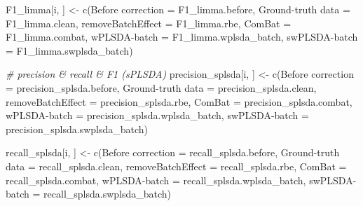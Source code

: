 \documentclass[
]{book}
\newenvironment{Shaded}{\begin{snugshade}}{\end{snugshade}}
\newcommand{\AttributeTok}[1]{\textcolor[rgb]{0.77,0.63,0.00}{#1}}
\newcommand{\CommentTok}[1]{\textcolor[rgb]{0.56,0.35,0.01}{\textit{#1}}}
\newcommand{\FunctionTok}[1]{\textcolor[rgb]{0.00,0.00,0.00}{#1}}
\newcommand{\NormalTok}[1]{#1}
\newcommand{\OtherTok}[1]{\textcolor[rgb]{0.56,0.35,0.01}{#1}}
\newcommand{\StringTok}[1]{\textcolor[rgb]{0.31,0.60,0.02}{#1}}
\begin{document}
\begin{Shaded}
\begin{Highlighting}[]
\NormalTok{  F1\_limma[i, ] }\OtherTok{\textless{}{-}} \FunctionTok{c}\NormalTok{(}\StringTok{\textasciigrave{}}\AttributeTok{Before correction}\StringTok{\textasciigrave{}} \OtherTok{=}\NormalTok{ F1\_limma.before, }
                     \StringTok{\textasciigrave{}}\AttributeTok{Ground{-}truth data}\StringTok{\textasciigrave{}} \OtherTok{=}\NormalTok{ F1\_limma.clean,}
                     \StringTok{\textasciigrave{}}\AttributeTok{removeBatchEffect}\StringTok{\textasciigrave{}} \OtherTok{=}\NormalTok{ F1\_limma.rbe,}
                     \AttributeTok{ComBat =}\NormalTok{ F1\_limma.combat,}
                     \StringTok{\textasciigrave{}}\AttributeTok{wPLSDA{-}batch}\StringTok{\textasciigrave{}} \OtherTok{=}\NormalTok{ F1\_limma.wplsda\_batch,}
                     \StringTok{\textasciigrave{}}\AttributeTok{swPLSDA{-}batch}\StringTok{\textasciigrave{}} \OtherTok{=}\NormalTok{ F1\_limma.swplsda\_batch)}
  
  
  \CommentTok{\# precision \& recall \& F1 (sPLSDA)}
\NormalTok{  precision\_splsda[i, ] }\OtherTok{\textless{}{-}} \FunctionTok{c}\NormalTok{(}\StringTok{\textasciigrave{}}\AttributeTok{Before correction}\StringTok{\textasciigrave{}} \OtherTok{=}\NormalTok{ precision\_splsda.before, }
                             \StringTok{\textasciigrave{}}\AttributeTok{Ground{-}truth data}\StringTok{\textasciigrave{}} \OtherTok{=}\NormalTok{ precision\_splsda.clean,}
                             \StringTok{\textasciigrave{}}\AttributeTok{removeBatchEffect}\StringTok{\textasciigrave{}} \OtherTok{=}\NormalTok{ precision\_splsda.rbe,}
                             \AttributeTok{ComBat =}\NormalTok{ precision\_splsda.combat,}
                             \StringTok{\textasciigrave{}}\AttributeTok{wPLSDA{-}batch}\StringTok{\textasciigrave{}} \OtherTok{=}\NormalTok{ precision\_splsda.wplsda\_batch,}
                             \StringTok{\textasciigrave{}}\AttributeTok{swPLSDA{-}batch}\StringTok{\textasciigrave{}} \OtherTok{=}\NormalTok{ precision\_splsda.swplsda\_batch)}
  
\NormalTok{  recall\_splsda[i, ] }\OtherTok{\textless{}{-}} \FunctionTok{c}\NormalTok{(}\StringTok{\textasciigrave{}}\AttributeTok{Before correction}\StringTok{\textasciigrave{}} \OtherTok{=}\NormalTok{ recall\_splsda.before, }
                          \StringTok{\textasciigrave{}}\AttributeTok{Ground{-}truth data}\StringTok{\textasciigrave{}} \OtherTok{=}\NormalTok{ recall\_splsda.clean,}
                          \StringTok{\textasciigrave{}}\AttributeTok{removeBatchEffect}\StringTok{\textasciigrave{}} \OtherTok{=}\NormalTok{ recall\_splsda.rbe,}
                          \AttributeTok{ComBat =}\NormalTok{ recall\_splsda.combat,}
                          \StringTok{\textasciigrave{}}\AttributeTok{wPLSDA{-}batch}\StringTok{\textasciigrave{}} \OtherTok{=}\NormalTok{ recall\_splsda.wplsda\_batch,}
                          \StringTok{\textasciigrave{}}\AttributeTok{swPLSDA{-}batch}\StringTok{\textasciigrave{}} \OtherTok{=}\NormalTok{ recall\_splsda.swplsda\_batch)}
  

\end{Highlighting}
\end{Shaded}
\end{document}
